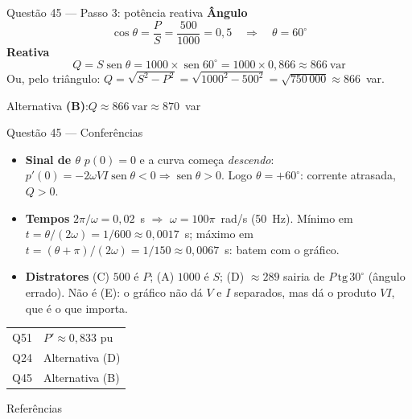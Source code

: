 \documentclass[aspectratio=169,11pt]{beamer}
\providecommand{\sen}{\operatorname{sen}}   %
\newcommand{\passo}[1]{{\color{Teal}\bfseries #1}\enspace}
\begin{document}
\begin{frame}{Questão 45 --- Passo 3: potência reativa}
  \passo{Ângulo}
  \[
    \cos\theta = \frac{P}{S} = \frac{500}{1000} = 0{,}5
    \quad\Longrightarrow\quad \theta = 60^\circ
  \]
  \pause
  \passo{Reativa}
  \[
    Q = S\sen\theta = 1000 \times \sen 60^\circ = 1000 \times 0{,}866
      \approx 866~\text{var}
  \]
  \pause
  {\small Ou, pelo triângulo: $Q = \sqrt{S^2 - P^2} = \sqrt{1000^2 - 500^2}
  = \sqrt{750\,000} \approx 866$~var.}
  \pause
  \begin{resposta}
    \centering Alternativa \textbf{(B)}:\quad $Q \approx 866~\text{var}
    \approx 870$~var
  \end{resposta}
\end{frame}

\begin{frame}{Questão 45 --- Conferências}
  \small
  \begin{itemize}
    \item \passo{Sinal de $\theta$} $p(0) = 0$ e a curva começa
          \emph{descendo}: $p'(0) = -2\omega VI\sen\theta < 0
          \Rightarrow \sen\theta > 0$. Logo $\theta = +60^\circ$: corrente
          atrasada, $Q > 0$.
    \pause
    \item \passo{Tempos} $2\pi/\omega = 0{,}02$~s $\Rightarrow$ $\omega =
          100\pi$~rad/s (50~Hz). Mínimo em $t = \theta/(2\omega) = 1/600
          \approx 0{,}0017$~s; máximo em $t = (\theta + \pi)/(2\omega) =
          1/150 \approx 0{,}0067$~s: batem com o gráfico.
    \pause
    \item \passo{Distratores} (C) $500$ é $P$; (A) $1000$ é $S$; (D)
          $\approx 289$ sairia de $P\,\mathrm{tg}\,30^\circ$ (ângulo
          errado). Não é (E): o gráfico não dá $V$ e $I$ separados, mas dá o
          produto $VI$, que é o que importa.
  \end{itemize}
\end{frame}

\begin{frame}[standout]
  \begin{tabular}{rl}
    Q51 & $P' \approx 0{,}833$ pu \\[0.4em]
    Q24 & Alternativa (D) \\[0.4em]
    Q45 & Alternativa (B)
  \end{tabular}
\end{frame}

\begin{frame}[allowframebreaks]{Referências}
  \nocite{bichels2018sep,borges2005analise,stevenson1986elementos}
  \printbibliography[heading=none]
\end{frame}
\end{document}
